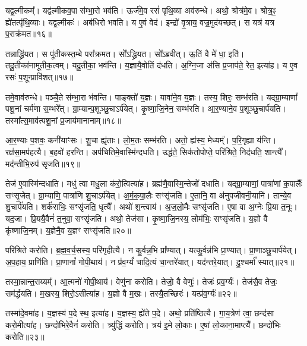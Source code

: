 यद्व॒ल्मीकम्᳚। 
यद्व॑ल्मीकव॒पा स॑म्भा॒रो भव॑ति। 
ऊर्ज॑मे॒व रसं॑ पृथि॒व्या अव॑रुन्धे। 
अथो॒ श्रोत्र॑मे॒व। 
श्रोत्र॒ꣴ॒ ह्ये॑तत्पृ॑थि॒व्याः। 
यद्व॒ल्मीकः॑। 
अब॑धिरो भवति। 
य ए॒वं वेद॑। 
इन्द्रो॑ वृ॒त्राय॒ वज्र॒मुद॑यच्छत्। 
स यत्र॑ यत्र प॒राक्र॑मत॥१६॥

तन्नाद्ध्रि॑यत। 
स पू॑तीकस्त॒म्बे परा᳚क्रमत। 
सो᳚ऽद्ध्रियत। 
सो᳚ऽब्रवीत्। 
ऊ॒तिं वै मे॑ धा॒ इति॑। 
तदू॒तीका॑नामूतीक॒त्वम्। 
यदू॒तीका॒ भव॑न्ति। 
य॒ज्ञायै॒वोतिं द॑धति। 
अ॒ग्नि॒जा अ॑सि प्र॒जाप॑ते॒ रेत॒ इत्या॑ह। 
य ए॒व रसः॑ प॒शून्प्रावि॑शत्॥१७॥

तमे॒वाव॑रुन्धे। 
पञ्चै॒ते स॑म्भा॒रा भ॑वन्ति। 
पाङ्क्तो॑ य॒ज्ञः। 
यावा॑ने॒व य॒ज्ञः। 
तस्य॒ शिरः॒ सम्भ॑रति। 
यद्ग्रा॒म्याणां᳚ पशू॒नां चर्म॑णा स॒म्भरे᳚त्। 
ग्रा॒म्यान्प॒शूञ्छु॒चाऽर्प॑येत्। 
कृ॒ष्णा॒जि॒नेन॒ सम्भ॑रति। 
आ॒र॒ण्याने॒व प॒शूञ्छु॒चार्प॑यति। 
तस्मा᳚त्स॒माव॑त्पशू॒नां प्र॒जाय॑मानानाम्॥१८॥

आ॒र॒ण्याः प॒शवः॒ कनी॑याꣳसः। 
शु॒चा ह्यृ॑ताः। 
लो॒म॒तः सम्भ॑रति। 
अतो॒ ह्य॑स्य॒ मेध्यम्᳚। 
प॒रि॒गृह्या य॑न्ति। 
रक्ष॑सा॒मप॑हत्यै। 
ब॒हवो॑ हरन्ति। 
अप॑चितिमे॒वास्मि॑न्दधति। 
उद्ध॑ते॒ सिक॑तोपोप्ते॒ परि॑श्रिते॒ निद॑धति॒ शान्त्यै᳚। 
मद॑न्तीभि॒रुप॑ सृजति॥१९॥

तेज॑ ए॒वास्मि॑न्दधाति। 
मधु॑ त्वा मधु॒ला क॑रो॒त्वित्या॑ह। 
ब्रह्म॑णै॒वास्मि॒न्तेजो॑ दधाति। 
यद्ग्रा॒म्याणां॒ पात्रा॑णां क॒पालैः᳚ सꣳसृ॒जेत्। 
ग्रा॒म्याणि॒ पात्रा॑णि शु॒चाऽर्प॑येत्। 
अ॒र्म॒क॒पा॒लैः सꣳसृ॑जति। 
ए॒तानि॒ वा अ॑नुपजीवनी॒यानि॑। 
तान्ये॒व शु॒चार्प॑यति। 
शर्क॑राभिः॒ सꣳसृ॑जति॒ धृत्यै᳚। 
अथो॑ श॒न्त्वाय॑। 
अ॒ज॒लो॒मैः सꣳसृ॑जति। 
ए॒षा वा अ॒ग्नेः प्रि॒या त॒नूः। 
यद॒जा। 
प्रि॒ययै॒वैनं॑ त॒नुवा॒ सꣳसृ॑जति। 
अथो॒ तेज॑सा। 
कृ॒ष्णा॒जि॒नस्य॒ लोम॑भिः॒ सꣳसृ॑जति। 
य॒ज्ञो वै कृ॑ष्णाजि॒नम्। 
य॒ज्ञेनै॒व य॒ज्ञꣳ सꣳसृ॑जति॥२०॥
\anuvakamend[या॒ज्या॑यै॒ न जु॑हु॒यादवि॑श॒द्वेणुः॒ शान्त्यै॑ प॒ङ्क्तिरा॑धस॒मित्या॑ह हरति दिहन्ति प॒राक्र॑म॒तावि॑शत् प्र॒जाय॑मानानाꣳ सृजति श॒न्त्वाया॒ष्टौ च॑]

परि॑श्रिते करोति। 
ब्र॒ह्म॒व॒र्च॒सस्य॒ परि॑गृहीत्यै। 
न कु॒र्वन्न॒भि प्रा᳚ण्यात्। 
यत्कु॒र्वन्न॑भि प्रा॒ण्यात्। 
प्रा॒णाञ्छु॒चार्प॑येत्। 
अ॒प॒हाय॒ प्राणि॑ति। 
प्रा॒णानां᳚ गोपी॒थाय॑। 
न प्र॑व॒र्ग्यं॑ चादि॒त्यं चा॒न्तरे॑यात्। 
यद॑न्तरे॒यात्। 
दु॒श्चर्मा᳚ स्यात्॥२१॥

तस्मा॒न्नान्त॒राय्यम्᳚। 
आ॒त्मनो॑ गोपी॒थाय॑। 
वेणु॑ना करोति। 
तेजो॒ वै वेणुः॑। 
तेजः॑ प्रव॒र्ग्यः॑। 
तेज॑सै॒व तेजः॒ सम॑र्द्धयति। 
म॒खस्य॒ शिरो॒ऽसीत्या॑ह। 
य॒ज्ञो वै म॒खः। 
तस्यै॒तच्छिरः॑। 
यत्प्र॑व॒र्ग्यः॑॥२२॥

तस्मा॑दे॒वमा॑ह। 
य॒ज्ञस्य॑ प॒दे स्थ॒ इत्या॑ह। 
य॒ज्ञस्य॒ ह्ये॑ते प॒दे। 
अथो॒ प्रति॑ष्ठित्यै। 
गा॒य॒त्रेण॑ त्वा॒ छन्द॑सा करो॒मीत्या॑ह। 
छन्दो॑भिरे॒वैनं॑ करोति। 
त्र्यु॑द्धिं करोति। 
त्रय॑ इ॒मे लो॒काः। 
ए॒षां लो॒काना॒माप्त्यै᳚। 
छन्दो॑भिः करोति॥२३॥

